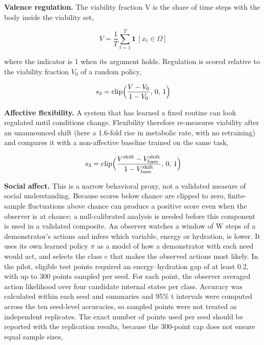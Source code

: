 \documentclass[twoside,11pt]{article}
\begin{document}
\textbf{Valence regulation.} The viability fraction V is the share of time steps with the body inside the viability set,

\begin{equation}\label{eq:10}
V=\frac{1}{T}\sum_{t=1}^{T}\mathbf{1}\,[x_t\in\Omega]
\end{equation}

\noindent where the indicator is 1 when its argument holds. Regulation is scored relative to the viability fraction $V_{0}$ of a random policy,

\begin{equation}\label{eq:11}
s_2=\operatorname{clip}\Bigl(\frac{V-V_0}{1-V_0},\,0,\,1\Bigr)
\end{equation}

\noindent \textbf{Affective flexibility.} A system that has learned a fixed routine can look regulated until conditions change. Flexibility therefore re-measures viability after an unannounced shift (here a 1.6-fold rise in metabolic rate, with no retraining) and compares it with a non-affective baseline trained on the same task,

\begin{equation}\label{eq:12}
s_3=\operatorname{clip}\Bigl(\frac{V^{\mathrm{shift}}-V^{\mathrm{shift}}_{\mathrm{base}}}{1-V^{\mathrm{shift}}_{\mathrm{base}}},\,0,\,1\Bigr)
\end{equation}

\noindent \textbf{Social affect.} This is a narrow behavioral proxy, not a validated measure of social understanding. Because scores below chance are clipped to zero, finite-sample fluctuations above chance can produce a positive score even when the observer is at chance; a null-calibrated analysis is needed before this component is used in a validated composite. An observer watches a window of W steps of a demonstrator's actions and infers which variable, energy or hydration, is lower. It uses its own learned policy \ensuremath{\pi} as a model of how a demonstrator with each need would act, and selects the class c that makes the observed actions most likely. In the pilot, eligible test points required an energy--hydration gap of at least 0.2, with up to 300 points sampled per seed. For each point, the observer averaged action likelihood over four candidate internal states per class. Accuracy was calculated within each seed and summaries and 95\% t intervals were computed across the ten seed-level accuracies, so sampled points were not treated as independent replicates. The exact number of points used per seed should be reported with the replication results, because the 300-point cap does not ensure equal sample sizes,
\end{document}
